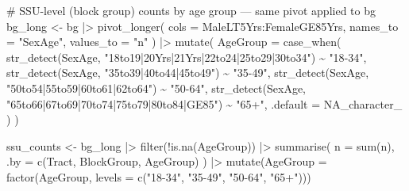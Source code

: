 \documentclass[
  12pt]{article}
\newenvironment{Shaded}{\begin{snugshade}}{\end{snugshade}}
\newcommand{\AttributeTok}[1]{\textcolor[rgb]{0.40,0.45,0.13}{#1}}
\newcommand{\CommentTok}[1]{\textcolor[rgb]{0.37,0.37,0.37}{#1}}
\newcommand{\ConstantTok}[1]{\textcolor[rgb]{0.56,0.35,0.01}{#1}}
\newcommand{\FunctionTok}[1]{\textcolor[rgb]{0.28,0.35,0.67}{#1}}
\newcommand{\NormalTok}[1]{\textcolor[rgb]{0.00,0.23,0.31}{#1}}
\newcommand{\OtherTok}[1]{\textcolor[rgb]{0.00,0.23,0.31}{#1}}
\newcommand{\SpecialCharTok}[1]{\textcolor[rgb]{0.37,0.37,0.37}{#1}}
\newcommand{\StringTok}[1]{\textcolor[rgb]{0.13,0.47,0.30}{#1}}
\begin{document}
\begin{Shaded}
\begin{Highlighting}[]
\CommentTok{\# SSU{-}level (block group) counts by age group — same pivot applied to bg}
\NormalTok{bg\_long }\OtherTok{\textless{}{-}}\NormalTok{ bg }\SpecialCharTok{|\textgreater{}}
  \FunctionTok{pivot\_longer}\NormalTok{(}
    \AttributeTok{cols =}\NormalTok{ MaleLT5Yrs}\SpecialCharTok{:}\NormalTok{FemaleGE85Yrs,}
    \AttributeTok{names\_to =} \StringTok{"SexAge"}\NormalTok{,}
    \AttributeTok{values\_to =} \StringTok{"n"}
\NormalTok{  ) }\SpecialCharTok{|\textgreater{}}
  \FunctionTok{mutate}\NormalTok{(}
    \AttributeTok{AgeGroup =} \FunctionTok{case\_when}\NormalTok{(}
      \FunctionTok{str\_detect}\NormalTok{(SexAge, }\StringTok{"18to19|20Yrs|21Yrs|22to24|25to29|30to34"}\NormalTok{) }\SpecialCharTok{\textasciitilde{}} \StringTok{"18{-}34"}\NormalTok{,}
      \FunctionTok{str\_detect}\NormalTok{(SexAge, }\StringTok{"35to39|40to44|45to49"}\NormalTok{)                    }\SpecialCharTok{\textasciitilde{}} \StringTok{"35{-}49"}\NormalTok{,}
      \FunctionTok{str\_detect}\NormalTok{(SexAge, }\StringTok{"50to54|55to59|60to61|62to64"}\NormalTok{)             }\SpecialCharTok{\textasciitilde{}} \StringTok{"50{-}64"}\NormalTok{,}
      \FunctionTok{str\_detect}\NormalTok{(SexAge, }\StringTok{"65to66|67to69|70to74|75to79|80to84|GE85"}\NormalTok{) }\SpecialCharTok{\textasciitilde{}} \StringTok{"65+"}\NormalTok{,}
      \AttributeTok{.default =} \ConstantTok{NA\_character\_}
\NormalTok{    )}
\NormalTok{  )}

\NormalTok{ssu\_counts }\OtherTok{\textless{}{-}}\NormalTok{ bg\_long }\SpecialCharTok{|\textgreater{}}
  \FunctionTok{filter}\NormalTok{(}\SpecialCharTok{!}\FunctionTok{is.na}\NormalTok{(AgeGroup)) }\SpecialCharTok{|\textgreater{}}
  \FunctionTok{summarise}\NormalTok{(}
    \AttributeTok{n =} \FunctionTok{sum}\NormalTok{(n),}
    \AttributeTok{.by =} \FunctionTok{c}\NormalTok{(Tract, BlockGroup, AgeGroup)}
\NormalTok{  ) }\SpecialCharTok{|\textgreater{}}
  \FunctionTok{mutate}\NormalTok{(}\AttributeTok{AgeGroup =} \FunctionTok{factor}\NormalTok{(AgeGroup, }\AttributeTok{levels =} \FunctionTok{c}\NormalTok{(}\StringTok{"18{-}34"}\NormalTok{, }\StringTok{"35{-}49"}\NormalTok{, }\StringTok{"50{-}64"}\NormalTok{, }\StringTok{"65+"}\NormalTok{)))}
\end{Highlighting}
\end{Shaded}




\end{document}
